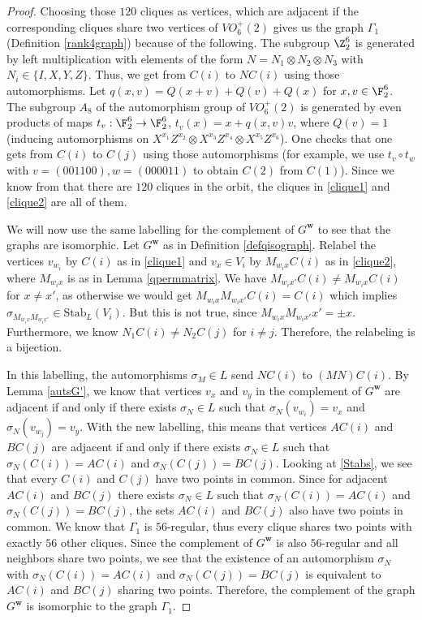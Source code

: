 \begin{proof}
Choosing those $120$ cliques as vertices, which are adjacent if the corresponding cliques share two vertices of $VO_6^+(2)$ gives us the graph $\Gamma_1$ (Definition \ref{rank4graph}) because of the following. The subgroup $\Z_2^6$ is generated by left multiplication with elements of the form $N=N_1\otimes N_2 \otimes N_3$ with $N_i\in \{I,X,Y,Z\}$. Thus, we get from $C(i)$ to $NC(i)$ using those automorphisms. Let $q(x,v)=Q(x+v)+Q(v)+Q(x)$ for $x,v \in \F_2^6$. The subgroup $A_8$ of the automorphism group of $VO_6^+(2)$ is generated by even products of maps $t_v:\F_2^6\to \F_2^6$, $t_v(x)=x+q(x,v)v$, where $Q(v)=1$ (inducing automorphisms on $X^{x_1}Z^{x_2}\otimes X^{x_3}Z^{x_4}\otimes X^{x_5}Z^{x_6}$). One checks that one gets from $C(i)$ to $C(j)$ using those automorphisms (for example, we use $t_v\circ t_w$ with $v=(001100), w=(000011)$ to obtain $C(2)$ from $C(1)$). Since we know from \cite{BIK} that there are $120$ cliques in the orbit, the cliques in \eqref{clique1} and \eqref{clique2} are all of them. 

We will now use the same labelling for the complement of $G^{\boldsymbol{w}}$ to see that the graphs are isomorphic. Let $G^{\boldsymbol{w}}$ as in Definition \ref{defqisograph}. Relabel the vertices $v_{w_i}$ by $C(i)$ as in \eqref{clique1} and $v_x\in V_i$ by $M_{w_ix}C(i)$ as in \eqref{clique2}, where $M_{w_ix}$ is as in Lemma \ref{qpermmatrix}. We have $M_{w_ix'}C(i)\neq M_{w_ix}C(i)$ for $x\neq x'$, as otherwise we would get $M_{w_ix}M_{w_ix'}C(i)=C(i)$ which implies $\sigma_{M_{w_ix}M_{w_ix'}}\in \mathrm{Stab}_L(V_i)$. But this is not true, since $M_{w_ix}M_{w_ix'}x'=\pm x$. Furthermore, we know $N_1C(i)\neq N_2C(j)$ for $i\neq j$. Therefore, the relabeling is a bijection. 

In this labelling, the automorphisms $\sigma_M\in L$ send $NC(i)$ to $(MN)C(i)$. By Lemma \ref{autsG'}, we know that vertices $v_x$ and $v_y$ in the complement of $G^{\boldsymbol{w}}$ are adjacent if and only if there exists $\sigma_N\in L$ such that $\sigma_N(v_{w_i})=v_x$ and $\sigma_N(v_{w_j})=v_y$. With the new labelling, this means that vertices $AC(i)$ and $BC(j)$ are adjacent if and only if there exists $\sigma_N\in L$ such that $\sigma_N(C(i))=AC(i)$ and $\sigma_N(C(j))=BC(j)$. Looking at \eqref{Stabs}, we see that every $C(i)$ and $C(j)$ have two points in common. Since for adjacent $AC(i)$ and $BC(j)$ there exists $\sigma_N \in L$ such that $\sigma_N(C(i))=AC(i)$ and $\sigma_N(C(j))=BC(j)$, the sets $AC(i)$ and $BC(j)$ also have two points in common. We know that $\Gamma_1$ is $56$-regular, thus every clique shares two points with exactly $56$ other cliques. Since the complement of $G^{\boldsymbol{w}}$ is also $56$-regular and all neighbors share two points, we see that the existence of an automorphism $\sigma_N$ with $\sigma_N(C(i))=AC(i)$ and $\sigma_N(C(j))=BC(j)$ is equivalent to $AC(i)$ and $BC(j)$ sharing two points. Therefore, the complement of the graph $G^{\boldsymbol{w}}$ is isomorphic to the graph $\Gamma_1$. 
\end{proof}

